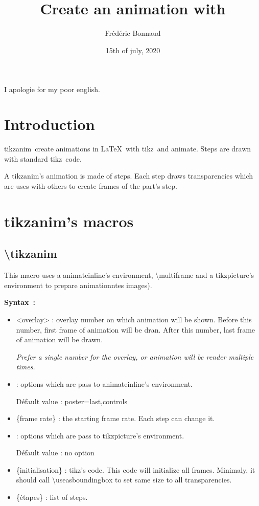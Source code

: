 \documentclass[a4paper,12pt]{article}
\author{Frédéric Bonnaud}%
\title{\TikzAnimate\\ Create an animation with \Tikz}
\date{15th of july, 2020}
\newcommand\Tikz{{\ttfamily tikz}}
\newcommand\TikzAnimate{{\ttfamily tikzanim}}
\newcommand\Animate{{\ttfamily animate}}
\begin{document}
\maketitle

\tableofcontents

\bigskip

I apologie for my poor english.

\section{Introduction}

\TikzAnimate\ create animations in \LaTeX\ with  \Tikz\ and \Animate. Steps are drawn with standard \Tikz\ code. 

A \TikzAnimate's animation is made of steps. Each step draws transparencies which are uses with others to create frames of the part's step.

\section{\TikzAnimate's macros}

\subsection{\ttfamily\textbackslash tikzanim}

	This macro uses a {\ttfamily animateinline}'s environment, {\ttfamily\textbackslash multiframe} and a {\ttfamily tikzpicture}'s environment to prepare animationntes images).
	
	\textbf{Syntax~:} 
	
	
	\begin{itemize}
		\item {\ttfamily <overlay>} : overlay number on which animation will be shown. Before this number, first frame of animation will be dran. After this number, last frame of animation will be drawn.
		
		\emph{Prefer a single number for the overlay, or animation will be render multiple times.}
		\item {} : options which are pass to {\ttfamily animateinline}'s environment.
		
		Défault value : {\ttfamily poster=last,controls}
		\item {\ttfamily \{frame rate\}} : the starting frame rate. Each step can change it.
		\item {} : options which are pass to {\ttfamily tikzpicture}'s environment.
		
		Défault value : no option
		\item {\ttfamily \{initialisation\}} : \Tikz's code. This code will initialize all frames. Minimaly, it should call {\ttfamily\textbackslash useasboundingbox} to
		set same size to all transparencies.
		\item {\ttfamily \{étapes\}} : list of steps. 
	\end{itemize}
	
\end{document}
